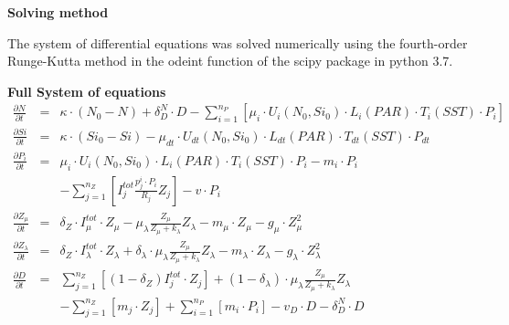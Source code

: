 

{\bf {Solving method}}

The system of differential equations was solved numerically using the fourth-order Runge-Kutta method in the odeint function of the scipy package in python 3.7. 



{\bf {Full System of equations}}
\begin{eqnarray*}
\frac{\partial N}{\partial t} & = & 
\kappa \cdot \left(N_{0} - N\right) + 
\delta^{N}_{D} \cdot D -
\sum_{i=1}^{n_P} [\mu_i \cdot U_{i}(N_0,Si_0)\cdot L_i(PAR)\cdot T_i(SST) \cdot P_{i}] 
\nonumber \\
\frac{\partial Si}{\partial t} & = & 
\kappa \cdot \left(Si_{0} - Si\right) 
- \mu_{dt} \cdot U_{dt}(N_0,Si_0) \cdot L_{dt}(PAR)\cdot T_{dt}(SST) \cdot P_{dt}
\nonumber \\
\frac{\partial P_{i}}{\partial t} & = & 
\mu_{i} \cdot U_{i}(N_0,Si_0)\cdot L_{i}(PAR)\cdot T_{i}(SST) \cdot P_{i}
- m_{i} \cdot P_{i} \\
&& - \sum_{j=1}^{n_Z} [I^{tot}_j \frac{p^i_{j} \cdot P_{i}} {R_{j}} Z_{j}] -
v\cdot P_{i} 
\nonumber \\
\frac{\partial Z_{\mu}}{\partial t} & = & 
\delta_Z \cdot I^{tot}_{\mu} \cdot Z_{\mu}-
\mu^{}_{\lambda} \frac{Z_{\mu}}{Z_{\mu}+k_{\lambda}} Z_{\lambda}-
m_{\mu} \cdot Z_{\mu} - 
g_{\mu} \cdot Z_{\mu}^{2}
\nonumber \\
\frac{\partial Z_{\lambda}}{\partial t} & = & 
\delta_Z \cdot I^{tot}_{\lambda} \cdot Z_{\lambda}+
\delta_{\lambda} \cdot \mu^{}_{\lambda} \frac{Z_{\mu}}{Z_{\mu}+k_{\lambda}} Z_{\lambda}-
m_{\lambda} \cdot Z_{\lambda} - 
g_{\lambda} \cdot Z_{\lambda}^{2}
\nonumber \\
\frac{\partial D}{\partial t} & = & 
\sum_{j=1}^{n_Z} [(1-\delta_Z) I^{tot}_j \cdot Z_{j}] +
(1-\delta_{\lambda}) \cdot \mu^{}_{\lambda} \frac{Z_{\mu}}{Z_{\mu}+k_{\lambda}} Z_{\lambda} \\
&& -\sum_{j=1}^{n_Z} [m_j \cdot Z_{j}] +
\sum_{i=1}^{n_P} [m_i \cdot P_{i}] -
v_{D} \cdot D -
\delta^{N}_{D} \cdot D
\nonumber
\end{eqnarray*}
 
